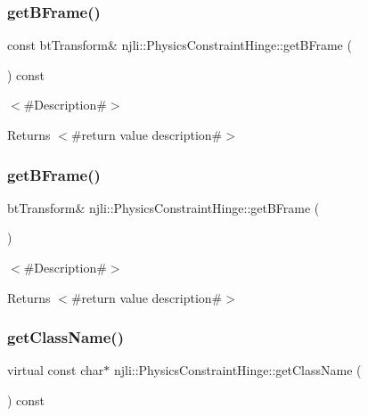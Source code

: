 \subsubsection{\texorpdfstring{get\+B\+Frame()}{getBFrame()}\hspace{0.1cm}{\footnotesize\ttfamily [1/2]}}
{\footnotesize\ttfamily const bt\+Transform\& njli\+::\+Physics\+Constraint\+Hinge\+::get\+B\+Frame (\begin{DoxyParamCaption}{ }\end{DoxyParamCaption}) const}

$<$\#\+Description\#$>$

\begin{DoxyReturn}{Returns}
$<$\#return value description\#$>$ 
\end{DoxyReturn}
\mbox{\label{classnjli_1_1_physics_constraint_hinge_a2f14b879a49458109f66fc0f78d51a25}} 
\subsubsection{\texorpdfstring{get\+B\+Frame()}{getBFrame()}\hspace{0.1cm}{\footnotesize\ttfamily [2/2]}}
{\footnotesize\ttfamily bt\+Transform\& njli\+::\+Physics\+Constraint\+Hinge\+::get\+B\+Frame (\begin{DoxyParamCaption}{ }\end{DoxyParamCaption})}

$<$\#\+Description\#$>$

\begin{DoxyReturn}{Returns}
$<$\#return value description\#$>$ 
\end{DoxyReturn}
\mbox{\label{classnjli_1_1_physics_constraint_hinge_a30edeca9b74147307de1440a37dac556}} 
\subsubsection{\texorpdfstring{get\+Class\+Name()}{getClassName()}}
{\footnotesize\ttfamily virtual const char$\ast$ njli\+::\+Physics\+Constraint\+Hinge\+::get\+Class\+Name (\begin{DoxyParamCaption}{ }\end{DoxyParamCaption}) const\hspace{0.3cm}{\ttfamily [virtual]}}

